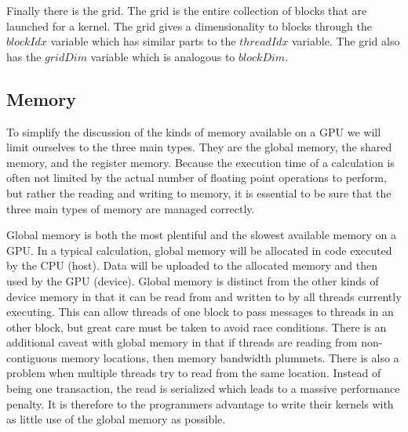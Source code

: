 Finally there is the grid. The grid is the entire collection of blocks that are launched for a kernel. The grid gives a dimensionality to blocks through the $blockIdx$ variable which has similar parts to the $threadIdx$ variable. The grid also has the $gridDim$ variable which is analogous to $blockDim$.

\subsection{Memory}
\label{sec:gpumem}
To simplify the discussion of the kinds of memory available on a GPU we will limit ourselves to the three main types. They are the global memory, the shared memory, and the register memory. Because the execution time of a calculation is often not limited by the actual number of floating point operations to perform, but rather the reading and writing to memory, it is essential to be sure that the three main types of memory are managed correctly.

Global memory is both the most plentiful and the slowest available memory on a GPU. In a typical calculation, global memory will be allocated in code executed by the CPU (host). Data will be uploaded to the allocated memory and then used by the GPU (device). Global memory is distinct from the other kinds of device memory in that it can be read from and written to by all threads currently executing. This can allow threads of one block to pass messages to threads in an other block, but great care must be taken to avoid race conditions. There is an additional caveat with global memory in that if threads are reading from non-contiguous memory locations, then memory bandwidth plummets. There is also a problem when multiple threads try to read from the same location. Instead of being one transaction, the read is serialized which leads to a massive performance penalty. It is therefore to the programmers advantage to write their kernels with as little use of the global memory as possible.

